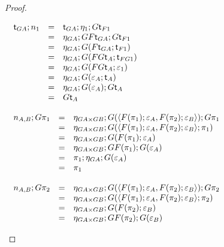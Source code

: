 \begin{proof}
  \begin{center}
    \footnotesize
    \begin{math}
      \begin{array}{lll}
        \begin{array}{lll}
          \mathsf{t}_{GA};n_{1}
          & = & \mathsf{t}_{GA};\eta_1;G\mathsf{t}_{F1}\\
          & = & \eta_{GA};GF\mathsf{t}_{GA};G\mathsf{t}_{F1}\\
          & = & \eta_{GA};G(F\mathsf{t}_{GA};\mathsf{t}_{F1})\\
          & = & \eta_{GA};G(FG\mathsf{t}_{A};\mathsf{t}_{FG1})\\
          & = & \eta_{GA};G(FG\mathsf{t}_{A};\varepsilon_{1})\\
          & = & \eta_{GA};G(\varepsilon_{A};\mathsf{t}_{A})\\
          & = & \eta_{GA};G(\varepsilon_{A});G\mathsf{t}_{A}\\
          & = & G\mathsf{t}_{A}\\
        \end{array}
        \\\\
        \begin{array}{lll}
          n_{A,B};G\pi_1
          & = & \eta_{GA \times GB};G(\langle F(\pi_1);\varepsilon_A, F(\pi_2);\varepsilon_B \rangle);G\pi_1\\
          & = & \eta_{GA \times GB};G(\langle F(\pi_1);\varepsilon_A, F(\pi_2);\varepsilon_B \rangle;\pi_1)\\
          & = & \eta_{GA \times GB};G(F(\pi_1);\varepsilon_A)\\
          & = & \eta_{GA \times GB};GF(\pi_1);G(\varepsilon_A)\\
          & = & \pi_1;\eta_{GA};G(\varepsilon_A)\\
          & = & \pi_1
        \end{array}
        \\\\
        \begin{array}{lll}
          n_{A,B};G\pi_2
          & = & \eta_{GA \times GB};G(\langle F(\pi_1);\varepsilon_A, F(\pi_2);\varepsilon_B \rangle);G\pi_2\\
          & = & \eta_{GA \times GB};G(\langle F(\pi_1);\varepsilon_A, F(\pi_2);\varepsilon_B \rangle;\pi_2)\\
          & = & \eta_{GA \times GB};G(F(\pi_2);\varepsilon_B)\\
          & = & \eta_{GA \times GB};GF(\pi_2);G(\varepsilon_B)\\

\end{array}
\end{array}
\end{math}
\end{center}
\end{proof}
